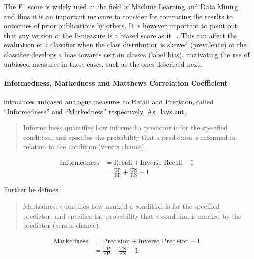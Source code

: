 The F1 score is widely used in the field of Machine Learning and Data Mining and thus it is an important measure to consider for comparing the results to outcomes of prior publications by others.
It is however important to point out that any version of the F-measure is a biased score as it ~\cite{Powers:2011aa}. This can affect the evaluation of a classifier when the class distribution is skewed (prevalence) or the classifier develops a bias towards certain classes (label bias), motivating the use of unbiased measures in these cases, such as the ones described next.

\paragraph{Informedness, Markedness and Matthews Correlation Coefficient}
\label{par:Informedness, Markedness and Matthews Correlation Coefficient}

\cite{Powers:2011aa} introduces unbiased analogue measures to Recall and Precision, called ``Informedness'' and ``Markedness'' respectively. As~\cite{Powers:2011aa} lays out, \blockquote{Informedness quantifies how informed a predictor is for the specified condition, and specifies the probability that a prediction is informed in relation to the condition (versus chance).}:

\begin{equation}
  \begin{split}
  \text{Informedness} &= \text{Recall} + \text{Inverse Recall} \text{ – } 1 \\
  &=\frac{\text{TP}}{ \text{RP}} + \frac{\text{TN}}{\text{RN}} \text{ – } 1
  \end{split}
\end{equation}

Further he defines:
\blockquote{Markedness quantifies how marked a condition is for the specified predictor, and specifies the probability that a condition is marked by the predictor (versus chance).}

\begin{equation}
  \begin{split}
  \text{Markedness} &= \text{Precision} + \text{Inverse Precision} \text{ – } 1\\
  &=\frac{\text{TP}}{ \text{PP}} + \frac{\text{TN}}{\text{PN}} \text{ – } 1
  \end{split}
\end{equation}

